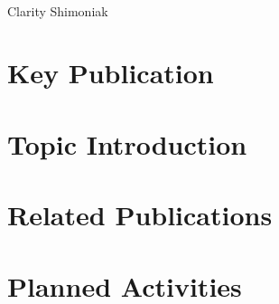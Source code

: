 \documentclass[12pt,letterpaper,english]{article}
\begin{document}
\begin{center}
	{\Huge\todo[Title]} \\
	Clarity Shimoniak
\end{center}

\section*{Key Publication}

\nocite{main}
\printbibliography[heading=none, keyword=main]


\section*{Topic Introduction}



\section*{Related Publications}

\nocite{phipps2023pre}
\nocite{baedorf2023reverse}
\nocite{aydin2023fpga}
\nocite{pistellato2023quantization}
\nocite{madineni2023parameterizable}
\nocite{naufal2023comparative}
\nocite{yan2023end}
\printbibliography[heading=none, notkeyword=main]


\section*{Planned Activities}

\end{document}

